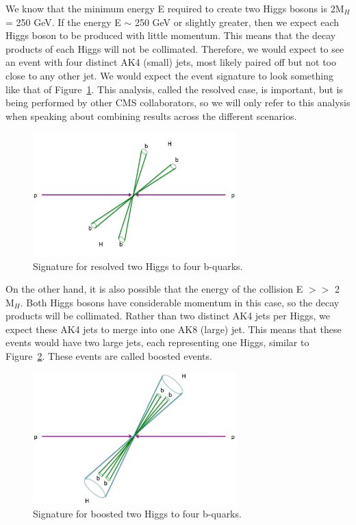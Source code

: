We know that the minimum energy E required to create two Higgs bosons is 2$\text{M}_{H}$ = 250 GeV. If the energy E $\sim$ 250 GeV or slightly greater, then we expect each Higgs boson to be produced with little momentum. This means that the decay products of each Higgs will not be collimated. Therefore, we would expect to see an event with four distinct AK4 (small) jets, most likely paired off but not too close to any other jet. We would expect the event signature to look something like that of Figure~\ref{Fig:threecases1}. This analysis, called the resolved case, is important, but is being performed by other CMS collaborators, so we will only refer to this analysis when speaking about combining results across the different scenarios.
\begin{figure}[h!]
    \centering
       \includegraphics[width=0.7\textwidth]{F4/resolved.png}
        \caption{Signature for resolved two Higgs to four b-quarks.}
        \label{Fig:threecases1}
\end{figure}

On the other hand, it is also possible that the energy of the collision E $>>$ 2$\text{M}_{H}$. Both Higgs bosons have considerable momentum in this case, so the decay products will be collimated. Rather than two distinct AK4 jets per Higgs, we expect these AK4 jets to merge into one AK8 (large) jet. This means that these events would have two large jets, each representing one Higgs, similar to Figure~\ref{Fig:threecases2}. These events are called boosted events.
\begin{figure}[h!]
    \centering
        \includegraphics[width=0.7\textwidth]{F4/merged.png}
        \caption{Signature for boosted two Higgs to four b-quarks.}
        \label{Fig:threecases2}
\end{figure}

